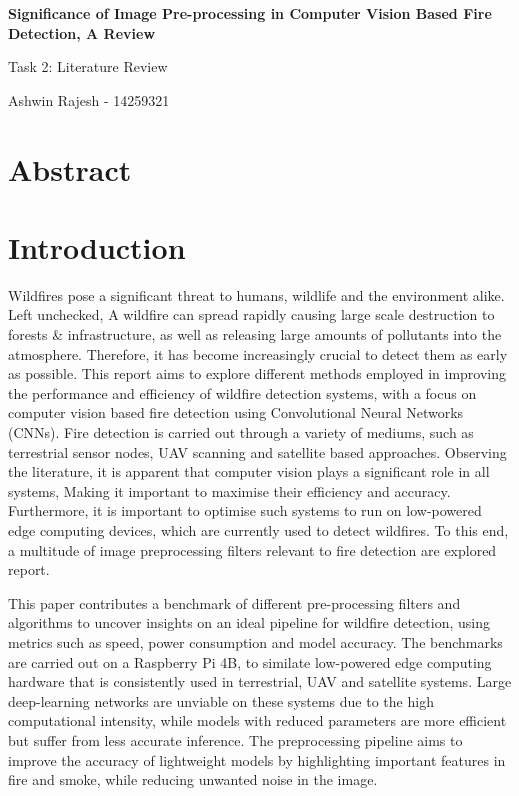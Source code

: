 \textbf{Significance of Image Pre-processing in Computer Vision Based
Fire Detection, A Review}

Task 2: Literature Review

Ashwin Rajesh - 14259321

\section{Abstract}

\section{Introduction}

Wildfires pose a significant threat to humans, wildlife and the
environment alike. Left unchecked, A wildfire can spread rapidly causing
large scale destruction to forests \& infrastructure, as well as
releasing large amounts of pollutants into the atmosphere. Therefore, it
has become increasingly crucial to detect them as early as possible.
This report aims to explore different methods employed in improving the
performance and efficiency of wildfire detection systems, with a focus
on computer vision based fire detection using Convolutional Neural
Networks (CNNs). Fire detection is carried out through a variety of
mediums, such as terrestrial sensor nodes, UAV scanning and satellite
based approaches. Observing the literature, it is apparent that computer
vision plays a significant role in all systems, Making it important to
maximise their efficiency and accuracy. Furthermore, it is important to
optimise such systems to run on low-powered edge computing devices,
which are currently used to detect wildfires. To this end, a multitude
of image preprocessing filters relevant to fire detection are explored
report.

This paper contributes a benchmark of different pre-processing filters
and algorithms to uncover insights on an ideal pipeline for wildfire
detection, using metrics such as speed, power consumption and model
accuracy. The benchmarks are carried out on a Raspberry Pi 4B, to
similate low-powered edge computing hardware that is consistently used
in terrestrial, UAV and satellite systems. Large deep-learning networks
are unviable on these systems due to the high computational intensity,
while models with reduced parameters are more efficient but suffer from
less accurate inference. The preprocessing pipeline aims to improve the
accuracy of lightweight models by highlighting important features in
fire and smoke, while reducing unwanted noise in the image.

